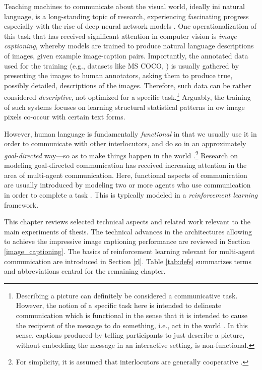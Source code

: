 Teaching machines to communicate about the visual world, ideally ini natural language, is a long-standing topic of research, experiencing fascinating progress especially with the rise of deep neural network models \parencite{lecun2015deep, lake2017building}. 
One operationalization of this task that has received significant attention in computer vision is \textit{image captioning}, whereby models are trained to produce natural language descriptions of images, given example image-caption pairs. Importantly, the annotated data used for the training (e.g., datasets like MS COCO, \cite{chen2015microsoft}) is usually gathered by presenting the images to human annotators, asking them to produce true, possibly detailed, descriptions of the images. Therefore, such data can be rather considered \textit{descriptive}, not optimized for a specific task.\footnote{Describing a picture can definitely be considered a communicative task. However, the notion of a specific task here is intended to delineate communication which is functional in the sense that it is intended to cause the recipient of the message to do something, i.e., act in the world \parencite{clark1996using, wittgenstein2010philosophical}. In this sense, captions produced by telling participants to just describe a picture, without embedding the message in an interactive setting, is non-functional.} Arguably, the training of such systems focuses on learning structural statistical patterns in ow image pixels co-occur with certain text forms.

However, human language is fundamentally \textit{functional} in that we usually use it in order to communicate with other interlocutors, and do so in an approximately \textit{goal-directed} way---so as to make things happen in the world \parencite[e.g., ][]{wittgenstein2010philosophical, clark1996using}.\footnote{For simplicity, it is assumed that interlocutors are generally cooperative \parencite{grice1975logic}.} 
Research on modeling goal-directed communication has received increasing attention in the area of multi-agent communication. Here, functional aspects of communication are usually introduced by modeling two or more agents who use communication in order to complete a task \parencite{lazaridou2020multi}. This is typically modeled in a \textit{reinforcement learning} framework. 

This chapter reviews selected technical aspects and related work relevant to the main experiments of thesis. The technical advances in the architectures allowing to achieve the impressive image captioning performance are reviewed in Section \ref{image_captioning}. The basics of reinforcement learning relevant for multi-agent communication are introduced in Section \ref{rl}. Table \ref{tab:defs} summarizes terms and abbreviations central for the remaining chapter. 

